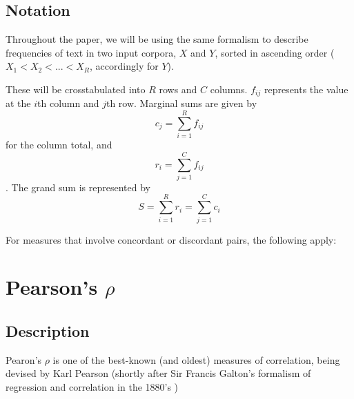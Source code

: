 \documentclass[11pt]{article}
\begin{document}
\subsection{Notation}
Throughout the paper, we will be using the same formalism to describe frequencies of text in two input corpora, $X$ and $Y$, sorted in ascending order ($X_1 < X_2 < ... < X_R$, accordingly for $Y$).

These will be crosstabulated into $R$ rows and $C$ columns.  $f_{ij}$ represents the value at the $i$th column and $j$th row.  Marginal sums are given by 
$$ c_j = \sum_{i=1}^{R}f_{ij} $$ for the column total, and $$ r_i = \sum_{j=1}^{C}f_{ij} $$.  The grand sum is represented by $$S = \sum_{i=1}^{R}r_i = \sum_{j=1}^{C}c_i $$

For measures that involve concordant or discordant pairs, the following apply:









%
%

\section{Pearson's $\rho$} %
\subsection{Description}
Pearon's $\rho$ is one of the best-known (and oldest) measures of correlation, being devised by Karl Pearson (shortly after Sir Francis Galton's formalism of regression and correlation in the 1880's \cite{galton1888co}) %
\end{document}
